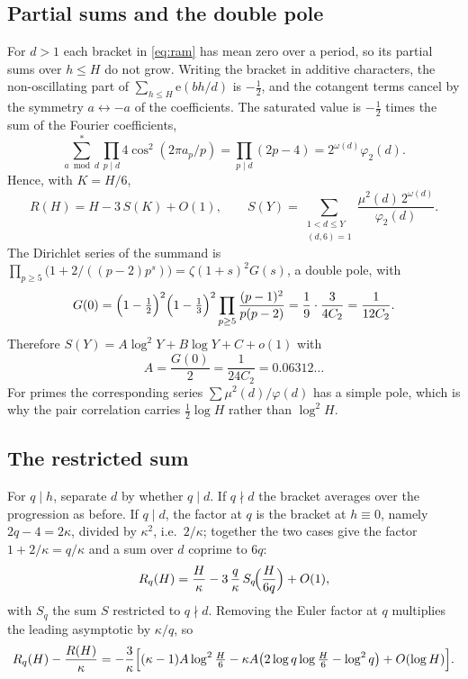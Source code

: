 \documentclass[11pt]{article}
\newcommand{\e}{\mathrm{e}}
\begin{document}
\subsection{Partial sums and the double pole}
For $d>1$ each bracket in \eqref{eq:ram} has mean zero over a period, so its partial sums over $h\le H$ do not grow. Writing the bracket in additive characters, the non-oscillating part of $\sum_{h\le H}\e(bh/d)$ is $-\frac12$, and the cotangent terms cancel by the symmetry $a\leftrightarrow -a$ of the coefficients. The saturated value is $-\frac12$ times the sum of the Fourier coefficients,
\[
\sum_{a\bmod d}^{*}\prod_{p\mid d}4\cos^2(2\pi a_p/p)=\prod_{p\mid d}(2p-4)=2^{\omega(d)}\varphi_2(d).
\]
Hence, with $K=H/6$,
\begin{equation}\label{eq:R}
R(H)=H-3\,S(K)+O(1),\qquad S(Y)=\sum_{\substack{1<d\le Y\\ (d,6)=1}}\frac{\mu^2(d)\,2^{\omega(d)}}{\varphi_2(d)}.
\end{equation}
The Dirichlet series of the summand is $\prod_{p\ge5}\bigl(1+2/((p-2)p^s)\bigr)=\zeta(1+s)^2G(s)$, a double pole, with
\[
G(0)=\Bigl(1-\tfrac12\Bigr)^2\Bigl(1-\tfrac13\Bigr)^2\prod_{p\ge5}\frac{(p-1)^2}{p(p-2)}=\frac19\cdot\frac{3}{4C_2}=\frac1{12C_2}.
\]
Therefore $S(Y)=A\log^2Y+B\log Y+C+o(1)$ with
\[
A=\frac{G(0)}{2}=\frac{1}{24C_2}=0.06312\ldots
\]
For primes the corresponding series $\sum\mu^2(d)/\varphi(d)$ has a simple pole, which is why the pair correlation carries $\frac12\log H$ rather than $\log^2H$.

\subsection{The restricted sum}
For $q\mid h$, separate $d$ by whether $q\mid d$. If $q\nmid d$ the bracket averages over the progression as before. If $q\mid d$, the factor at $q$ is the bracket at $h\equiv0$, namely $2q-4=2\kappa$, divided by $\kappa^2$, i.e.\ $2/\kappa$; together the two cases give the factor $1+2/\kappa=q/\kappa$ and a sum over $d$ coprime to $6q$:
\[
R_q(H)=\frac H\kappa-3\,\frac q\kappa\,S_q\!\Bigl(\frac H{6q}\Bigr)+O(1),
\]
with $S_q$ the sum $S$ restricted to $q\nmid d$. Removing the Euler factor at $q$ multiplies the leading asymptotic by $\kappa/q$, so
\begin{equation}\label{eq:diff}
R_q(H)-\frac{R(H)}\kappa=-\frac3\kappa\Bigl[(\kappa-1)A\log^2\tfrac H6-\kappa A\bigl(2\log q\log\tfrac H6-\log^2q\bigr)+O(\log H)\Bigr].
\end{equation}
\end{document}
